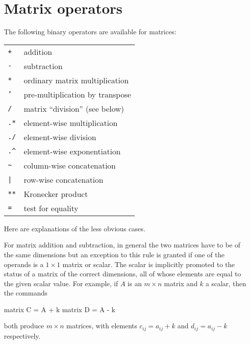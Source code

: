 
\section{Matrix operators}
\label{matrix-op}

The following binary operators are available for matrices:

\begin{center}
\begin{tabular}{ll}
\texttt{+} & addition \\
\texttt{-} & subtraction \\
\texttt{*} & ordinary matrix multiplication \\
\texttt{'} & pre-multiplication by transpose \\
\texttt{/} & matrix ``division'' (see below) \\
\texttt{.*} & element-wise multiplication \\
\texttt{./} & element-wise division \\
\verb+.^+ & element-wise exponentiation \\
\verb+~+ & column-wise concatenation \\
\verb+|+ & row-wise concatenation \\
\texttt{**} & Kronecker product \\
\texttt{=} & test for equality 
\end{tabular}
\end{center}

Here are explanations of the less obvious cases. 

For matrix addition and subtraction, in general the two matrices have
to be of the same dimensions but an exception to this rule is granted
if one of the operands is a $1\times 1$ matrix or scalar.  The scalar
is implicitly promoted to the status of a matrix of the correct
dimensions, all of whose elements are equal to the given scalar value.
For example, if $A$ is an $m \times n$ matrix and $k$ a scalar, then
the commands
%
\begin{code}
matrix C = A + k
matrix D = A - k
\end{code}
%
both produce $m \times n$ matrices, with elements $c_{ij} = 
a_{ij} + k$ and $d_{ij} = a_{ij} - k$ respectively.

